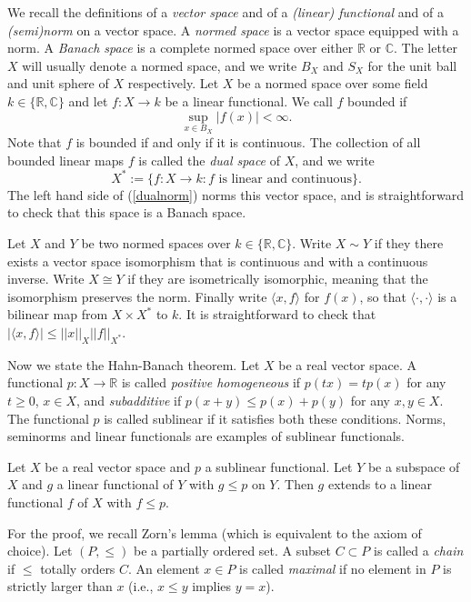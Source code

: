We recall the definitions of a \emph{vector space} and of a \emph{(linear) functional} and of a \emph{(semi)norm} on a vector space.
A \emph{normed space} is a vector space equipped with a norm.
A \emph{Banach space} is a complete normed space over either $\mathbb{R}$ or $\mathbb{C}$.
The letter $X$ will usually denote a normed space,
and we write $B_X$ and $S_X$ for the unit ball and unit sphere of $X$ respectively.
Let $X$ be a normed space over some field $k\in\{\mathbb{R},\mathbb{C}\}$
and let $f:X\to k$ be a linear functional.
We call $f$ bounded if
\begin{equation}
  \sup_{x\in B_X}|f(x)|<\infty.
  \label{dualnorm}
\end{equation}
Note that $f$ is bounded if and only if it is continuous.
The collection of all bounded linear maps $f$ is called the \emph{dual space} of $X$,
and we write
$$X^*:=\{f:X\to k:\text{$f$ is linear and continuous}\}.$$
The left hand side of (\ref{dualnorm}) norms this vector space,
and is straightforward to check that this space is a Banach space.


Let $X$ and $Y$ be two normed spaces over $k\in\{\mathbb{R},\mathbb{C}\}$.
Write $X\sim Y$ if they there exists a vector space isomorphism that is continuous
and with a continuous inverse.
Write $X\cong Y$ if they are isometrically isomorphic, meaning that the isomorphism preserves
the norm.
Finally write $\langle x,f\rangle$ for $f(x)$, so that
$\langle\cdot,\cdot\rangle$ is a bilinear map from $X\times X^*$ to $k$.
It is straightforward to check that $|\langle x,f\rangle|\leq ||x||_X||f||_{X^*}$.

Now we state the Hahn-Banach theorem.
Let $X$ be a real vector space.
A functional $p:X\to \mathbb{R}$ is called
\emph{positive homogeneous} if $p(tx)=tp(x)$ for any $t\geq 0$, $x\in X$,
and \emph{subadditive} if $p(x+y)\leq p(x)+p(y)$ for any $x,y\in X$.
The functional $p$ is called sublinear if it satisfies both these conditions.
Norms, seminorms and linear functionals are examples of sublinear functionals.

\begin{theorem}\label{hb1}
  Let $X$ be a real vector space and $p$ a sublinear functional.
  Let $Y$ be a subspace of $X$ and $g$ a linear functional of $Y$
  with $g\leq p$ on $Y$.
  Then $g$ extends to a linear functional $f$ of $X$ with $f\leq p$.
\end{theorem}

For the proof, we recall Zorn's lemma (which is equivalent to the axiom of choice).
Let $(P,\leq)$ be a partially ordered set.
A subset $C\subset P$ is called a \emph{chain} if $\leq$ totally orders $C$.
An element $x\in P$ is called \emph{maximal} if no element in $P$ is strictly larger than $x$
(i.e., $x\leq y$ implies $y=x$).

